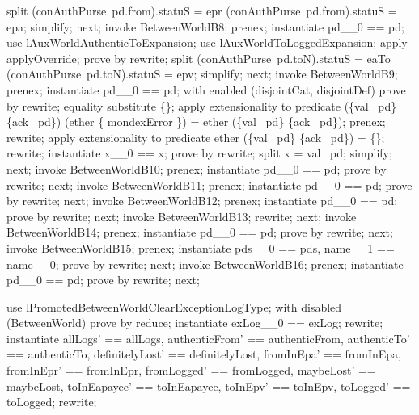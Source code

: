 \begin{LPScript}
\begin{zproof}[lPromotedBetweenWorldClearExceptionLogType]
        split (conAuthPurse~pd.from).statuS = epr
          \lor (conAuthPurse~pd.from).statuS = epa;
        simplify;
    next;
        invoke BetweenWorldB8;
        prenex;
        instantiate pd\_\_0 == pd;
        use lAuxWorldAuthenticToExpansion;
        use lAuxWorldToLoggedExpansion;
        apply applyOverride;
        prove by rewrite;
        split (conAuthPurse~pd.toN).statuS = eaTo
            \lor (conAuthPurse~pd.toN).statuS = epv;
        simplify;
    next;
        invoke BetweenWorldB9;
        prenex;
        instantiate pd\_\_0 == pd;
        with enabled (disjointCat, disjointDef) prove by rewrite;
        equality substitute \{\};
        apply extensionality to predicate
            (\{val~ pd\} \cup \{ack~ pd\}) \cap (ether \cup \{ mondexError \})
            = ether \cap (\{val~ pd\} \cup \{ack~ pd\});
        prenex;
        rewrite;
        apply extensionality to predicate
            ether \cap (\{val~ pd\} \cup \{ack~ pd\}) = \{\};
        rewrite;
        instantiate x\_\_0 == x;
        prove by rewrite;
        split x = val~ pd;
        simplify;
    next;
        invoke BetweenWorldB10;
        prenex;
        instantiate pd\_\_0 == pd;
        prove by rewrite;
    next;
        invoke BetweenWorldB11;
        prenex;
        instantiate pd\_\_0 == pd;
        prove by rewrite;
    next;
        invoke BetweenWorldB12;
        prenex;
        instantiate pd\_\_0 == pd;
        prove by rewrite;
    next;
        invoke BetweenWorldB13;
        rewrite;
    next;
        invoke BetweenWorldB14;
        prenex;
        instantiate pd\_\_0 == pd;
        prove by rewrite;
    next;
        invoke BetweenWorldB15;
        prenex;
        instantiate pds\_\_0 == pds, name\_\_1 == name\_\_0;
        prove by rewrite;
    next;
        invoke BetweenWorldB16;
        prenex;
        instantiate pd\_\_0 == pd;
        prove by rewrite;
    next;
\end{zproof}\end{LPScript}

\begin{LPScript}\begin{zproof}[tBetwClearExceptionLogEafromOkayPRE]
    use lPromotedBetweenWorldClearExceptionLogType;
    with disabled (BetweenWorld) prove by reduce;
    instantiate exLog\_\_0 == exLog;
    rewrite;
    instantiate allLogs' == allLogs, authenticFrom' == authenticFrom,
        authenticTo' == authenticTo, definitelyLost' == definitelyLost,
        fromInEpa' == fromInEpa, fromInEpr' == fromInEpr,
        fromLogged' == fromLogged, maybeLost' == maybeLost,
        toInEapayee' == toInEapayee, toInEpv' == toInEpv,
        toLogged' == toLogged;
    rewrite;
\end{zproof}\end{LPScript}

